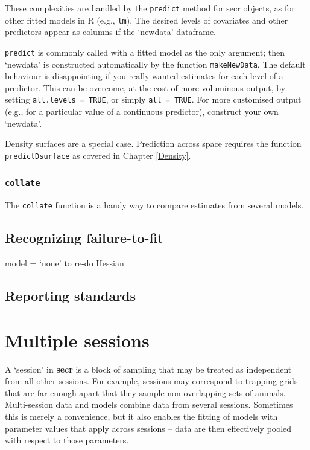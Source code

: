 \documentclass[
]{book}
\begin{document}
These complexities are handled by the \texttt{predict} method for secr objects, as for other fitted models in R (e.g., \texttt{lm}). The desired levels of covariates and other predictors appear as columns if the `newdata' dataframe.

\texttt{predict} is commonly called with a fitted model as the only argument; then `newdata' is constructed automatically by the function \texttt{makeNewData}. The default behaviour is disappointing if you really wanted estimates for each level of a predictor. This can be overcome, at the cost of more voluminous output, by setting \texttt{all.levels\ =\ TRUE}, or simply \texttt{all\ =\ TRUE}. For more customised output (e.g., for a particular value of a continuous predictor), construct your own `newdata'.

Density surfaces are a special case. Prediction across space requires the function \texttt{predictDsurface}
as covered in Chapter \ref{Density}.

\subsection{\texorpdfstring{\texttt{collate}}{collate}}\label{collate}

The \texttt{collate} function is a handy way to compare estimates from several models.

\section{Recognizing failure-to-fit}\label{recognizing-failure-to-fit}

model = `none' to re-do Hessian

\section{Reporting standards}\label{reporting-standards}

\chapter{Multiple sessions}\label{Multisession}

A `session' in \textbf{secr} is a block of sampling that may be treated as independent from all other sessions. For example, sessions may correspond to trapping grids that are far enough apart that they sample non-overlapping sets of animals. Multi-session data and models combine data from several sessions. Sometimes this is merely a convenience, but it also enables the fitting of models with parameter values that apply across sessions -- data are then effectively pooled with respect to those parameters.
\end{document}
